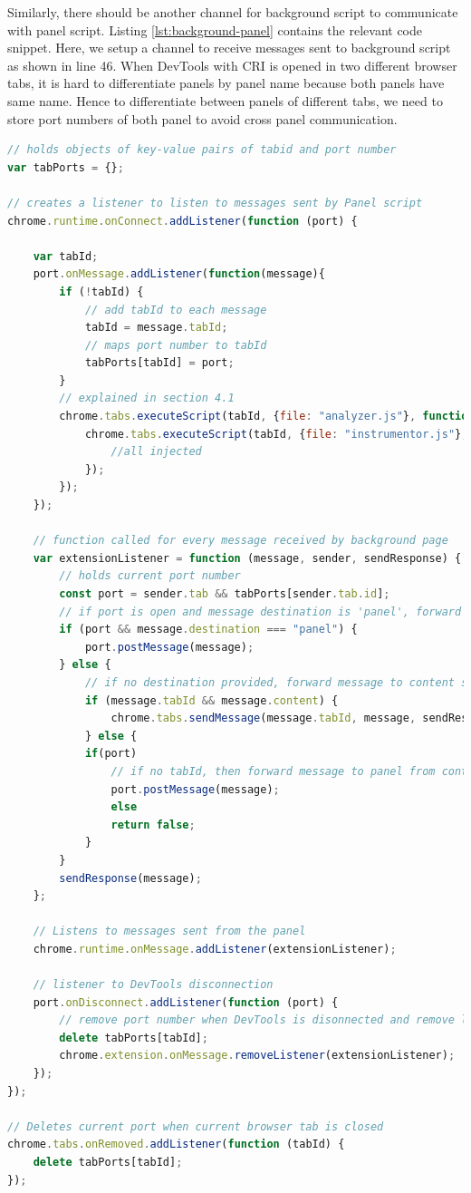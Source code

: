 Similarly, there should be another channel for background script to communicate with panel script. Listing \ref{lst:background-panel} contains the relevant code snippet. Here, we setup a channel to receive messages sent to background script as shown in line 46. When DevTools with CRI is opened in two different browser tabs, it is hard to differentiate panels by panel name because both panels have same name. Hence to differentiate between panels of different tabs, we need to store port numbers of both panel to avoid cross panel communication. 
\begin{lstlisting}[language=JavaScript, caption=Channel for background script to communicate with Panel script, label={lst:background-panel}]
// holds objects of key-value pairs of tabid and port number
var tabPorts = {};

// creates a listener to listen to messages sent by Panel script
chrome.runtime.onConnect.addListener(function (port) {
	
	var tabId;
	port.onMessage.addListener(function(message){
		if (!tabId) {
			// add tabId to each message
			tabId = message.tabId;
			// maps port number to tabId
			tabPorts[tabId] = port;
		}
		// explained in section 4.1
		chrome.tabs.executeScript(tabId, {file: "analyzer.js"}, function(){
			chrome.tabs.executeScript(tabId, {file: "instrumentor.js"}, function(){
				//all injected
			});
		});
	});
	
	// function called for every message received by background page
	var extensionListener = function (message, sender, sendResponse) {
		// holds current port number		
		const port = sender.tab && tabPorts[sender.tab.id];
		// if port is open and message destination is 'panel', forward message to Panel
		if (port && message.destination === "panel") {
			port.postMessage(message);
		} else {
			// if no destination provided, forward message to content script
			if (message.tabId && message.content) {
				chrome.tabs.sendMessage(message.tabId, message, sendResponse);
			} else {
			if(port)
				// if no tabId, then forward message to panel from content script
				port.postMessage(message);
				else
				return false;
			}	
		}
		sendResponse(message);
	};
	
	// Listens to messages sent from the panel
	chrome.runtime.onMessage.addListener(extensionListener);
	
	// listener to DevTools disconnection
	port.onDisconnect.addListener(function (port) {
		// remove port number when DevTools is disonnected and remove listener for message receivers
		delete tabPorts[tabId];
		chrome.extension.onMessage.removeListener(extensionListener);
	});
});

// Deletes current port when current browser tab is closed
chrome.tabs.onRemoved.addListener(function (tabId) {
	delete tabPorts[tabId];
});

\end{lstlisting}


